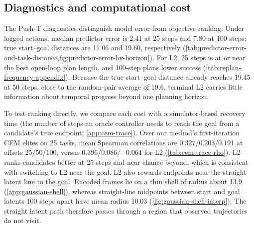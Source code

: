 \documentclass{article} %
\theoremstyle{definition}
\theoremstyle{remark}
\begin{document}
\subsection{Diagnostics and computational cost}
\label{sec:analysis}
\label{sec:problem}
The Push-T diagnostics distinguish model error from objective ranking.
Under logged actions, median predictor error is 2.41 at 25 steps and 7.80 at
100 steps; true start--goal distances are 17.06 and 19.60, respectively
(\cref{tab:predictor-error-and-task-distance,fig:predictor-error-by-horizon}).
For L2, 25 steps is at or near the best open-loop plan length, and 100-step plans lower
success (\cref{tab:replan-frequency-appendix}).
Because the true start--goal distance already reaches 19.45 at 50 steps, close to the
random-pair average of 19.6, terminal L2 carries little information about temporal progress
beyond one planning horizon.

To test ranking directly, we compare each cost with a simulator-based recovery time (the number
of steps an oracle controller needs to reach the goal from a candidate's true endpoint;
\cref{app:cem-trace}). Over our method's first-iteration CEM elites on 25 tasks, mean Spearman
correlations are 0.327/0.203/0.191 at offsets 25/50/100, versus 0.396/0.086/$-0.064$ for L2
(\cref{tab:cem-trace-rho}). L2 ranks candidates better at 25 steps and near chance beyond,
which is consistent with switching to L2 near the goal.
L2 also rewards endpoints near the straight latent line to the goal.
Encoded frames lie on a thin shell of radius about 13.9 (\cref{app:gaussian-shell}), whereas
straight-line midpoints between start and goal latents 100 steps apart have mean radius 10.03
(\cref{fig:gaussian-shell-interp}). The straight latent path therefore passes through a region
that observed trajectories do not visit.
\end{document}
